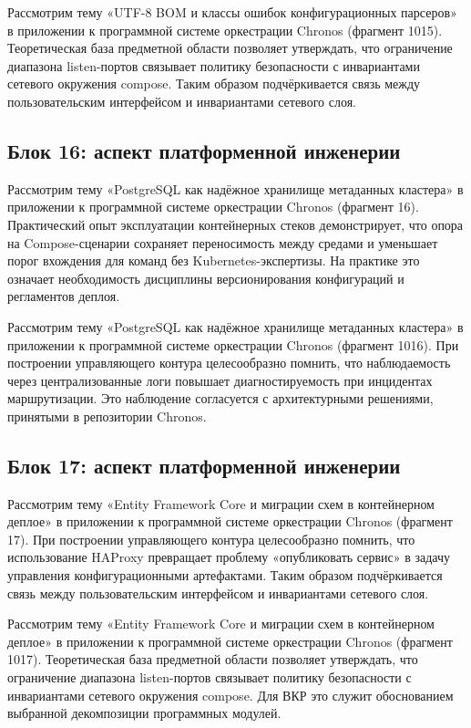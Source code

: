  Рассмотрим тему «UTF-8 BOM и классы ошибок конфигурационных парсеров» в приложении к программной системе оркестрации Chronos (фрагмент 1015). Теоретическая база предметной области позволяет утверждать, что ограничение диапазона listen-портов связывает политику безопасности с инвариантами сетевого окружения compose. Таким образом подчёркивается связь между пользовательским интерфейсом и инвариантами сетевого слоя.

\subsection{Блок 16: аспект платформенной инженерии}
 Рассмотрим тему «PostgreSQL как надёжное хранилище метаданных кластера» в приложении к программной системе оркестрации Chronos (фрагмент 16). Практический опыт эксплуатации контейнерных стеков демонстрирует, что опора на Compose-сценарии сохраняет переносимость между средами и уменьшает порог вхождения для команд без Kubernetes-экспертизы. На практике это означает необходимость дисциплины версионирования конфигураций и регламентов деплоя.

 Рассмотрим тему «PostgreSQL как надёжное хранилище метаданных кластера» в приложении к программной системе оркестрации Chronos (фрагмент 1016). При построении управляющего контура целесообразно помнить, что наблюдаемость через централизованные логи повышает диагностируемость при инцидентах маршрутизации. Это наблюдение согласуется с архитектурными решениями, принятыми в репозитории Chronos.

\subsection{Блок 17: аспект платформенной инженерии}
 Рассмотрим тему «Entity Framework Core и миграции схем в контейнерном деплое» в приложении к программной системе оркестрации Chronos (фрагмент 17). При построении управляющего контура целесообразно помнить, что использование HAProxy превращает проблему «опубликовать сервис» в задачу управления конфигурационными артефактами. Таким образом подчёркивается связь между пользовательским интерфейсом и инвариантами сетевого слоя.

 Рассмотрим тему «Entity Framework Core и миграции схем в контейнерном деплое» в приложении к программной системе оркестрации Chronos (фрагмент 1017). Теоретическая база предметной области позволяет утверждать, что ограничение диапазона listen-портов связывает политику безопасности с инвариантами сетевого окружения compose. Для ВКР это служит обоснованием выбранной декомпозиции программных модулей.

